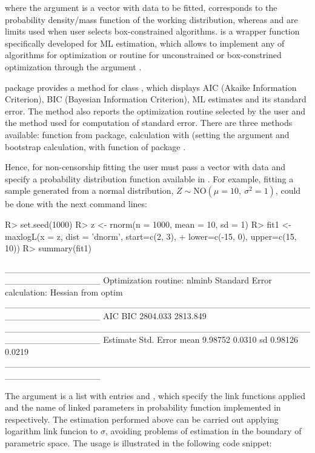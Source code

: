 \documentclass[nojss]{jss}
\begin{document}
where the argument  is a vector with data to be fitted,  corresponds to the probability density/mass function of the working distribution, whereas  and  are limits used when user selects box-constrained algorithms.  is a wrapper function specifically developed for ML estimation, which allows to implement any of  algorithms for optimization or  routine for unconstrained or box-constrined optimization through the argument .

 package provides a  method for class , which displays AIC (Akaike Information Criterion), BIC (Bayesian Information Criterion), ML estimates and its standard error. The method also reports the optimization routine selected by the user and the method used for computation of standard error. There are three methods available:  function from  package, calculation with  (setting the argument  and bootstrap calculation, with  function of  package \citep{Davison1997, Canty2017}.

Hence, for non-censorship fitting the user must pass a vector with data and specify a probability distribution function available in . For example, fitting a sample generated from a normal distribution, $Z \sim \text{NO}(\mu=10,\: \sigma^2=1)$, could be done with the next command lines:

\begin{Schunk}
\begin{Sinput}
R> set.seed(1000)
R> z <- rnorm(n = 1000, mean = 10, sd = 1)
R> fit1 <- maxlogL(x = z, dist = 'dnorm', start=c(2, 3),
+                  lower=c(-15, 0), upper=c(15, 10))
R> summary(fit1)
\end{Sinput}
\begin{Soutput}
_______________________________________________________________
Optimization routine: nlminb 
Standard Error calculation: Hessian from optim 
_______________________________________________________________
       AIC      BIC
  2804.033 2813.849
_______________________________________________________________
     Estimate  Std. Error
mean   9.98752     0.0310
sd     0.98126     0.0219
_______________________________________________________________
\end{Soutput}
\end{Schunk}

The  argument is a list with entries  and , which specify the link functions applied and the name of linked parameters in probability function implemented in  respectively. The estimation performed above can be carried out applying logarithm link funcion to $\sigma$, avoiding problems of estimation in the boundary of parametric space. The usage is illustrated in the following code snippet:
\end{document}
